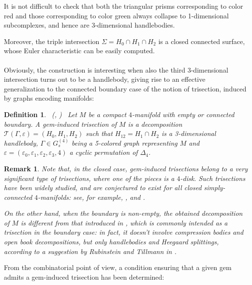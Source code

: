 \documentclass[12pt,a4paper]{article}
\newtheorem{definition}{Definition}
\newtheorem{remark}{Remark}
\newcommand{\qed}{\\ \rightline{$\Box$ \ \ \ \ \ \ \ \ \ \ \ \ \ \ \ }\\}
\newcommand{\e}{\varepsilon}
\begin{document}
\bigskip
It is not difficult to check that both the triangular prisms corresponding to color red and those corresponding to color green always collapse to 1-dimensional subcomplexes, and hence are 3-dimensional handlebodies.

Moreover, the triple intersection $\Sigma= H_0\cap H_1\cap H_2$ is a closed connected surface, whose Euler characteristic can 
be easily computed. 
\ \qed  


\bigskip
Obviously, the construction is interesting when also the third 3-dimensional intersection turns out to be a handlebody, giving rise to an effective generalization to the connected boundary case of the notion of trisection, induced by graphs encoding manifolds: 

\begin{definition}   \ {\rm (\cite{Casali-Cristofori gem-induced}, \cite{Casali-Cristofori trisection bis})} \  
{\em Let $M$ be a compact %
$4$-manifold with empty or connected boundary. 
A {\it gem-induced trisection} of $M$ is a decomposition 
$\mathcal  T(\Gamma, \varepsilon) =(H_{0},H_{1},H_{2})$ such that $H_{12}=H_1\cap H_2$ is a 3-dimensional handlebody, $\Gamma \in G_s^{(4)}$ being a 5-colored graph representing $M$ and $\e=(\e_0,\e_1,\e_2,\e_3,4)$ a cyclic permutation of $\Delta_4$.  }
\end{definition} 

\begin{remark}
{\em Note that, in the closed case, gem-induced trisections belong to a very significant type of trisections, where one of the pieces is a $4$-disk. Such trisections have been widely studied, and are conjectured to exist for all closed simply-connected $4$-manifolds: see, for example, \cite{Meier}, \cite{Lambert-Cole-Meier} and \cite{Meier-Schirmer-Zupan}. 

On the other hand, when the boundary is non-empty, the obtained decomposition of $M$ is different  from that introduced in  \cite{Castro-Gay-Pinzon}, which is commonly intended as a trisection in the boundary case: in fact, it doesn't involve compression bodies and open book decompositions, but only handlebodies and Heegaard splittings, according to a suggestion by Rubinstein and Tillmann in  \cite[Section 4.5]{Rubinstein-Tillmann}.    }   
\end{remark}


\bigskip
From the combinatorial point of view, a condition ensuring that a given gem admits a gem-induced trisection has been determined: 
\end{document}
